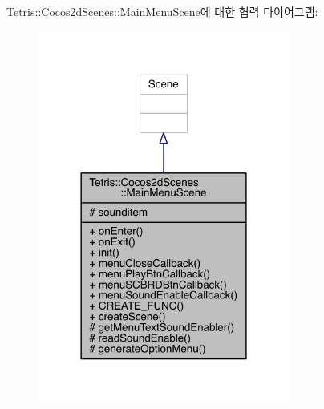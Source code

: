 Tetris\+:\+:Cocos2d\+Scenes\+:\+:Main\+Menu\+Scene에 대한 협력 다이어그램\+:
\nopagebreak
\begin{figure}[H]
\begin{center}
\leavevmode
\includegraphics[width=234pt]{d0/d5d/class_tetris_1_1_cocos2d_scenes_1_1_main_menu_scene__coll__graph}
\end{center}
\end{figure}
